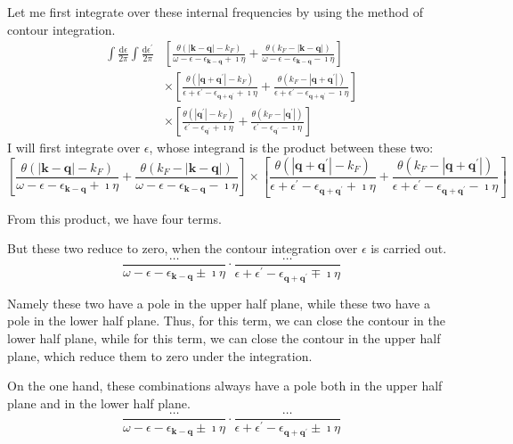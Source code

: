 Let me first integrate over these internal frequencies by using the method of contour integration.
\[ \begin{split} \int \frac{\mathrm{d}\epsilon}{2\pi} \int \frac{\mathrm{d}\epsilon^{'}}{2\pi}
&\left[ \frac{\theta(|\mathbf{k}-\mathbf{q}|-k_F)}{\omega - \epsilon - \epsilon_{\mathbf{k}-\mathbf{q}}+\imath \eta} + \frac{\theta(k_F-|\mathbf{k}-\mathbf{q}|)}{\omega - \epsilon - \epsilon_{\mathbf{k}-\mathbf{q}}-\imath \eta} \right] \\
& \times \left[ \frac{\theta(|\mathbf{q}+\mathbf{q}^{'}|-k_F)}{\epsilon + \epsilon^{'} - \epsilon_{\mathbf{q}+\mathbf{q}^{'}}+\imath \eta} + \frac{ \theta(k_F-|\mathbf{q}+\mathbf{q}^{'}|)}{\epsilon + \epsilon^{'} - \epsilon_{\mathbf{q}+\mathbf{q}^{'}}-\imath \eta} \right] \\
& \times \left[ \frac{\theta(|\mathbf{q}^{'}|-k_F)}{\epsilon^{'} - \epsilon_{\mathbf{q}^{'}}+\imath \eta} + \frac{\theta(k_F-|\mathbf{q}^{'}|)}{\epsilon^{'} - \epsilon_{\mathbf{q}^{'}}-\imath \eta} \right]
\end{split} \]
I will first integrate over $\epsilon$, whose integrand is the product between these two:
\[\left[ \frac{\theta(|\mathbf{k}-\mathbf{q}|-k_F)}{\omega - \epsilon - \epsilon_{\mathbf{k}-\mathbf{q}}+\imath \eta} + \frac{\theta(k_F-|\mathbf{k}-\mathbf{q}|)}{\omega - \epsilon - \epsilon_{\mathbf{k}-\mathbf{q}}-\imath \eta} \right]
\times \left[ \frac{\theta(|\mathbf{q}+\mathbf{q}^{'}|-k_F)}{\epsilon + \epsilon^{'} - \epsilon_{\mathbf{q}+\mathbf{q}^{'}}+\imath \eta} + \frac{ \theta(k_F-|\mathbf{q}+\mathbf{q}^{'}|)}{\epsilon + \epsilon^{'} - \epsilon_{\mathbf{q}+\mathbf{q}^{'}}-\imath \eta} \right] \]

From this product, we have four terms.

But these two reduce to zero, when the contour integration over $\epsilon$ is carried out.
\[ \frac{\ldots}{\omega - \epsilon - \epsilon_{\mathbf{k}-\mathbf{q}} \pm \imath \eta} \cdot \frac{ \ldots}{\epsilon + \epsilon^{'} - \epsilon_{\mathbf{q}+\mathbf{q}^{'}} \mp \imath \eta} \]

Namely these two have a pole in the upper half plane, while these two have a pole in the lower half plane. Thus, for this term, we can close the contour in the lower half plane, while for this term, we can close the contour in the upper half plane, which reduce them to zero under the integration.

On the one hand, these combinations always have a pole both in the upper half plane and in the lower half plane.
\[ \frac{\ldots}{\omega - \epsilon - \epsilon_{\mathbf{k}-\mathbf{q}} \pm \imath \eta} \cdot \frac{ \ldots}{\epsilon + \epsilon^{'} - \epsilon_{\mathbf{q}+\mathbf{q}^{'}} \pm \imath \eta} \]

